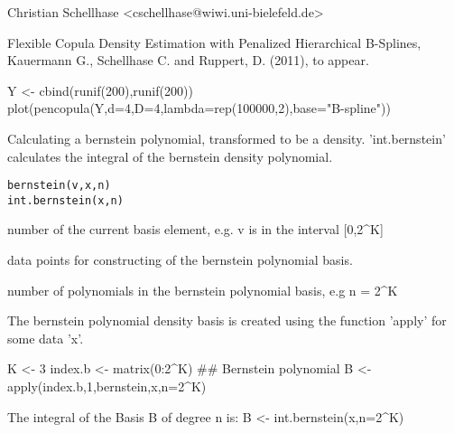 \documentclass[a4paper]{book}
\begin{document}
%
\begin{Author}\relax
Christian Schellhase <cschellhase@wiwi.uni-bielefeld.de>
\end{Author}
%
\begin{References}\relax
Flexible Copula Density Estimation with Penalized
Hierarchical B-Splines, Kauermann G., Schellhase C. and Ruppert, D. (2011), to appear.
\end{References}
%
\begin{Examples}
\begin{ExampleCode}
Y <- cbind(runif(200),runif(200))
plot(pencopula(Y,d=4,D=4,lambda=rep(100000,2),base="B-spline"))
\end{ExampleCode}
\end{Examples}
%
\begin{Description}\relax
Calculating a bernstein polynomial, transformed to be a
density. 'int.bernstein' calculates the integral of the bernstein
density polynomial.
\end{Description}
%
\begin{Usage}
\begin{verbatim}
bernstein(v,x,n)
int.bernstein(x,n)
\end{verbatim}
\end{Usage}
%
\begin{Arguments}
\begin{ldescription}
\item[\code{v}] number of the current basis element, e.g. v is in the interval [0,2\textasciicircum{}K]
\item[\code{x}] data points for constructing of the bernstein polynomial basis.
\item[\code{n}] number of polynomials in the bernstein polynomial basis, e.g n = 2\textasciicircum{}K   
\end{ldescription}
\end{Arguments}
%
\begin{Value}
The bernstein polynomial density basis is created using the function 'apply'
for some data 'x'.

K <- 3
index.b <- matrix(0:2\textasciicircum{}K)
\#\# Bernstein polynomial 
B <- apply(index.b,1,bernstein,x,n=2\textasciicircum{}K)

The integral of the Basis B of degree n is:
B <- int.bernstein(x,n=2\textasciicircum{}K)
\end{Value}
\end{document}
